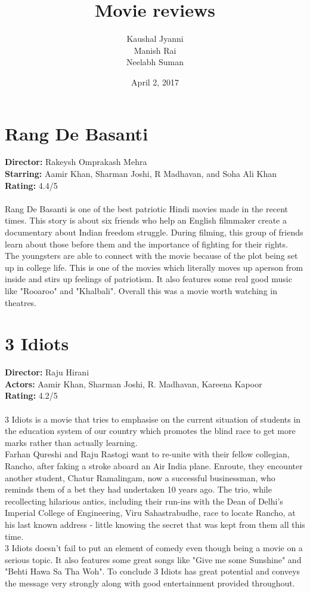 \documentclass[12pt, a4paper]{article}
\author{Kaushal Jyanni\\Manish Rai\\Neelabh Suman\\}
\title{\Huge Movie reviews}
\date{\small April 2, 2017}
\begin{document}
	\maketitle
	\section*{Rang De Basanti}
	\textbf{Director:}  Rakeysh Omprakash Mehra \\
	\textbf{Starring:} Aamir Khan, Sharman Joshi, R Madhavan, and Soha Ali Khan\\
	\textbf{Rating:} {4.4}/{5}\\\\
	Rang De Basanti is one of the best patriotic Hindi movies made in the recent times.	This story is about six friends who help an English filmmaker create a documentary about Indian freedom struggle. During filming, this group of friends learn about those before them and the importance of fighting for their rights.\\
    The youngsters are able to connect with the movie because of the plot being set up in college life. This is one of the movies which literally moves up aperson from inside and stirs up feelings of patriotism. It also features some real good music like "Rooaroo" and "Khalbali". Overall this was a movie worth watching in theatres.

	\section*{3 Idiots}
    \textbf{Director:} Raju Hirani\\
    \textbf{Actors:} Aamir Khan, Sharman Joshi, R. Madhavan, Kareena Kapoor\\
    \textbf{Rating:} {4.2}/{5}\\\\
    3 Idiots is a movie that tries to emphasise on the current situation of students in the education system of our country which promotes the blind race to get more marks rather than actually learning. \\
    Farhan Qureshi and Raju Rastogi want to re-unite with their fellow collegian, Rancho, after faking a stroke aboard an Air India plane. Enroute, they encounter another student, Chatur Ramalingam, now a successful businessman, who reminds them of a bet they had undertaken 10 years ago. The trio, while recollecting hilarious antics, including their run-ins with the Dean of Delhi's Imperial College of Engineering, Viru Sahastrabudhe, race to locate Rancho, at his last known address - little knowing the secret that was kept from them all this time.\\
    3 Idiots doesn't fail to put an element of comedy even though being a movie on a serious topic. It also features some great songs like "Give me some Sunshine" and "Behti Hawa Sa Tha Woh". To conclude 3 Idiots has great potential and conveys the message very strongly along with good entertainment provided throughout. 
    
\end{document}
